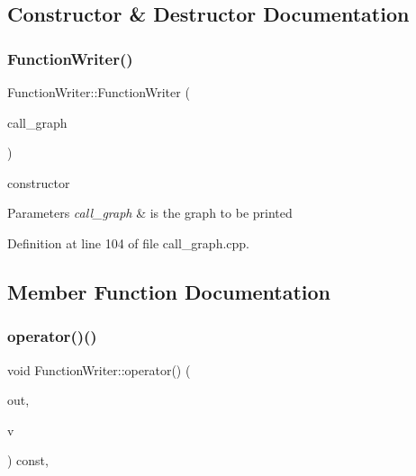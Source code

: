 \subsection{Constructor \& Destructor Documentation}
\mbox{\label{classFunctionWriter_a8b47649d2d52f4c5e7bad61b123e65a9}} 
\subsubsection{\texorpdfstring{Function\+Writer()}{FunctionWriter()}}
{\footnotesize\ttfamily Function\+Writer\+::\+Function\+Writer (\begin{DoxyParamCaption}\item[{const \hyperlink{classCallGraph}{Call\+Graph} $\ast$}]{call\+\_\+graph }\end{DoxyParamCaption})\hspace{0.3cm}{\ttfamily [explicit]}}



constructor 


\begin{DoxyParams}{Parameters}
{\em call\+\_\+graph} & is the graph to be printed \\
\hline
\end{DoxyParams}


Definition at line 104 of file call\+\_\+graph.\+cpp.



\subsection{Member Function Documentation}
\mbox{\label{classFunctionWriter_af935396f9e2d8a4ac426655ab37bcb39}} 
\subsubsection{\texorpdfstring{operator()()}{operator()()}}
{\footnotesize\ttfamily void Function\+Writer\+::operator() (\begin{DoxyParamCaption}\item[{std\+::ostream \&}]{out,  }\item[{const \hyperlink{graph_8hpp_abefdcf0544e601805af44eca032cca14}{vertex} \&}]{v }\end{DoxyParamCaption}) const\hspace{0.3cm}{\ttfamily [override]}, {\ttfamily [virtual]}}



